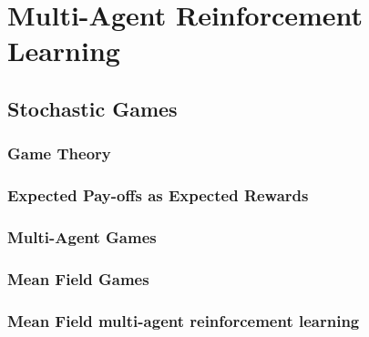 \section{Multi-Agent Reinforcement Learning}
\subsection{Stochastic Games}
\subsubsection{Game Theory}
\subsubsection{Expected Pay-offs as Expected Rewards}
\subsubsection{Multi-Agent Games}
\subsubsection{Mean Field Games}
\subsubsection{Mean Field multi-agent reinforcement learning}